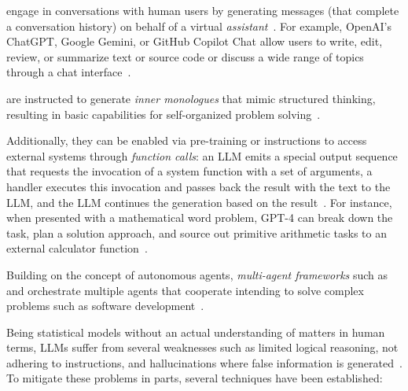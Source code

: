 \begin{description}[noextralabelsep]
	\item[Conversational agents] engage in conversations with human users by generating messages (that complete a conversation history) on behalf of a virtual \emph{assistant}~\cite{bai2022training}.
	For example, OpenAI's ChatGPT, Google Gemini, or GitHub Copilot Chat allow users to write, edit, review, or summarize text or source code or discuss a wide range of topics through a chat interface~\cite{openai2024gpt4}.

	\item[Autonomous agents] are instructed to generate \emph{inner monologues} that mimic structured thinking, resulting in basic capabilities for self-organized problem solving~\cite{yang2023autogpt}.

	Additionally, they can be enabled via pre-training or instructions to access external systems through \emph{function calls}: an LLM emits a special output sequence that requests the invocation of a system function with a set of arguments, a handler executes this invocation and passes back the result with the text to the LLM, and the LLM continues the generation based on the result~\cite{hao2023toolkengpt,mialon2023augmented,yang2023autogpt}.
	For instance, when presented with a mathematical word problem, GPT-4 can break down the task, plan a solution approach, and source out primitive arithmetic tasks to an external calculator function~\cite{openai2024gpt4}.

	Building on the concept of autonomous agents, \emph{multi-agent frameworks} such as  and  orchestrate multiple agents that cooperate intending to solve complex problems such as software development~\cite{hong2023metagpt,qian2023communicative}.
\end{description}

Being statistical models without an actual understanding of matters in human terms, LLMs suffer from several weaknesses such as limited logical reasoning, not adhering to instructions, and hallucinations where false information is generated~\cite{openai2024gpt4}.
To mitigate these problems in parts, several techniques have been established:

